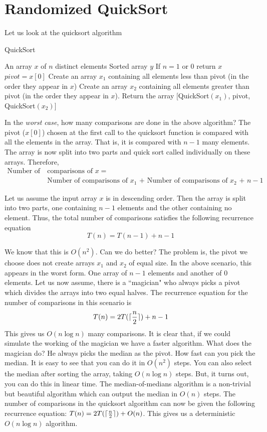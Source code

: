 \chapter{Randomized QuickSort}
Let us look at the quicksort algorithm
\begin{algorithm}[H]
 \caption{QuickSort}
 \label{alg:quicksort}
 \begin{algorithmic}[1]
 \renewcommand{\algorithmicrequire}{\textbf{Input:}}
 \renewcommand{\algorithmicensure}{\textbf{Output:}}
 \REQUIRE An array $x$ of $n$ distinct elements 
 \ENSURE  Sorted array $y$
 \STATE If $n = 1$ or $0$ return $x$
  \STATE $pivot = x[0]$
  \STATE Create an array $x_1$ containing all elements less than  pivot (in the order they appear in $x$) 
  \STATE Create an array $x_2$ containing all elements greater than pivot (in the order they appear in $x$).
  \STATE Return the array $[$QuickSort$(x_1)$, pivot, QuickSort$(x_2)]$
 \end{algorithmic} 
 \end{algorithm}
 
\noindent In the \emph{worst case}, how many comparisons are done in the above algorithm? The pivot ($x[0]$) chosen at the first call to the quicksort function is compared with all the elements in the array. That is, it is compared with $n-1$ many elements. The array is now split into two parts and quick sort called individually on these arrays. Therefore,
\begin{align*}
\text{Number of } & \text{comparisons of } x =  \\
&\text{Number of comparisons of $x_1$ + Number of comparisons of $x_2$ + $n-1$}
\end{align*}

\noindent Let us assume the input array $x$ is in descending order. Then the array is split into two parts, one containing $n-1$ elements and the other containing no element. Thus, the total number of comparisons satisfies the following recurrence equation
\[
T(n) = T(n-1) + n-1
\]

\noindent We know that this is $O(n^2)$. Can we do better? The problem is, the pivot we choose does not create arrays $x_1$ and $x_2$ of equal size. In the above scenario, this appears in the worst form. One array of $n-1$ elements and another of $0$ elements. Let us now assume, there is a ``magician" who always picks a pivot which divides the arrays into two equal halves. The recurrence equation for the number of comparisons in this scenario is
\[
T(n) = 2 T({\lceil}\frac{n}{2}{\rceil}) + n-1
\]
\noindent This gives us $O(n \log n)$ many comparisons. It is clear that, if we could simulate the working of the magician we have a faster algorithm. What does the magician do? He always picks the median as the pivot. How fast can you pick the median. It is easy to see that you can do it in $O(n^2)$ steps. You can also select the median after sorting the array, taking $O(n \log n)$ steps. But, it turns out, you can do this in linear time. The median-of-medians algorithm is a non-trivial but beautiful algorithm which can output the median in $O(n)$ steps. The number of comparisons in the quicksort algorithm can now be given the following recurrence equation: $T(n) =  2 T({\lceil}\frac{n}{2}{\rceil}) + O(n)$. This gives us a deterministic $O(n \log n)$ algorithm.

